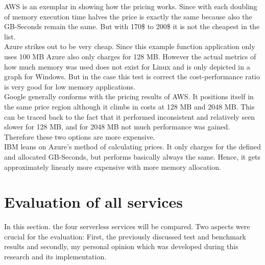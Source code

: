 \gls{AWS} is an exemplar in showing how the pricing works. Since with each doubling of memory execution time halves the price is exactly the same because also the GB-Seconds remain the same. But with 170\$ to 200\$ it is not the cheapest in the list.\\
Azure strikes out to be very cheap. Since this example function application only uses 100 \gls{MB} Azure also only charges for 128 \gls{MB}. However the actual metrics of how much memory was used does not exist for Linux and is only depicted in a graph for Windows. But in the case this test is correct the cost-performance ratio is very good for low memory applications.\\
Google generally conforms with the pricing results of \gls{AWS}. It positions itself in the same price region although it climbs in costs at 128 \gls{MB} and 2048 \gls{MB}. This can be traced back to the fact that it performed inconsistent and relatively seen slower for 128 MB, and for 2048 MB not much performance was gained. Therefore these two options are more expensive.\\
IBM leans on Azure's method of calculating prices. It only charges for the defined and allocated GB-Seconds, but performs basically always the same. Hence, it gets approximately linearly more expensive with more memory allocation.

\section{Evaluation of all services}
In this section. the four serverless services will be compared. Two aspects were crucial for the evaluation: First, the previously discussed test and benchmark results and secondly, my personal opinion which was developed during this research and its implementation.
